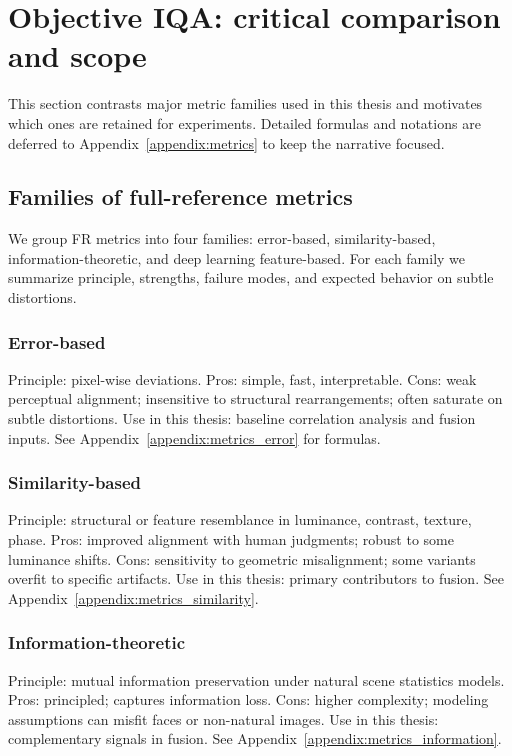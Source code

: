\section{Objective IQA: critical comparison and scope}\label{sec:objective_iqa_critical}
This section contrasts major metric families used in this thesis and motivates which ones are retained for experiments. Detailed formulas and notations are deferred to Appendix~\ref{appendix:metrics} to keep the narrative focused.

\subsection{Families of full-reference metrics}\label{sec:fr_families}
We group FR metrics into four families: error-based, similarity-based, information-theoretic, and deep learning feature-based. For each family we summarize principle, strengths, failure modes, and expected behavior on subtle distortions.

\subsubsection{Error-based}
Principle: pixel-wise deviations.
Pros: simple, fast, interpretable.
Cons: weak perceptual alignment; insensitive to structural rearrangements; often saturate on subtle distortions.
Use in this thesis: baseline correlation analysis and fusion inputs. See Appendix~\ref{appendix:metrics_error} for formulas.

\subsubsection{Similarity-based}
Principle: structural or feature resemblance in luminance, contrast, texture, phase.
Pros: improved alignment with human judgments; robust to some luminance shifts.
Cons: sensitivity to geometric misalignment; some variants overfit to specific artifacts.
Use in this thesis: primary contributors to fusion. See Appendix~\ref{appendix:metrics_similarity}.

\subsubsection{Information-theoretic}
Principle: mutual information preservation under natural scene statistics models.
Pros: principled; captures information loss.
Cons: higher complexity; modeling assumptions can misfit faces or non-natural images.
Use in this thesis: complementary signals in fusion. See Appendix~\ref{appendix:metrics_information}.

